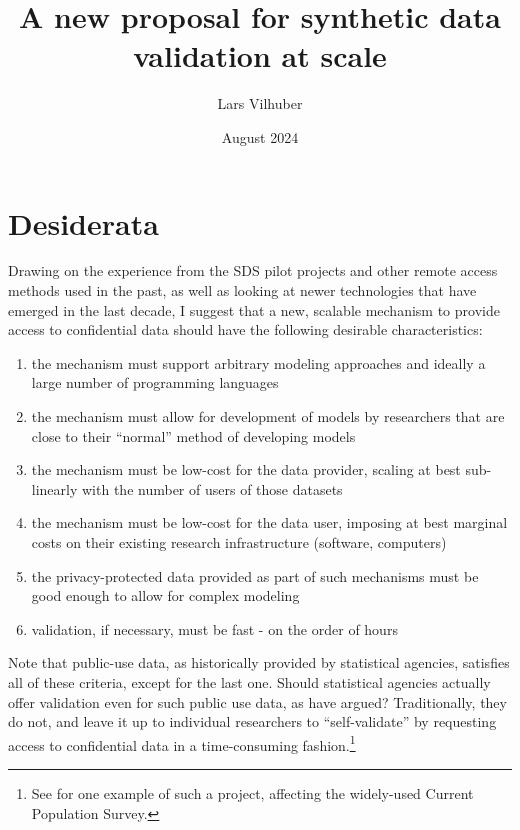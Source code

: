 \documentclass{article}
\title{A new proposal for synthetic data validation at scale}
\author{Lars Vilhuber}
\date{August 2024}
\begin{document}
\maketitle


\section{Desiderata}
\label{sec:desiderata}

Drawing on the experience from the SDS pilot projects and other remote access methods used in the past, as well as looking at newer technologies that have emerged in the last decade, I suggest that a new, scalable mechanism to provide access to confidential data should have the following desirable characteristics:

\begin{enumerate}
    \item the mechanism must support arbitrary modeling approaches and ideally a large number of programming languages
    \item the mechanism must allow for development of models by researchers that are close to their ``normal'' method of developing models
    \item the mechanism must be low-cost for the data provider, scaling at best sub-linearly with the number of users of those datasets
    \item the mechanism must be low-cost for the data user, imposing at best marginal costs on their existing research infrastructure (software, computers)
    \item the privacy-protected data provided as part of such mechanisms must be good enough to allow for complex modeling
    \item validation, if necessary, must be fast - on the order of hours
\end{enumerate}

Note that public-use data, as historically provided by statistical agencies, satisfies all of these criteria, except for the last one. Should statistical agencies actually offer validation even for such public use data, as \citet{reiter_verification_2009} have argued? Traditionally, they do not, and leave it up to individual researchers to ``self-validate'' by requesting access to confidential data in a time-consuming fashion.\footnote{See \cite{armour_using_2016} for one example of such a project, affecting the widely-used Current Population Survey.}
\end{document}
